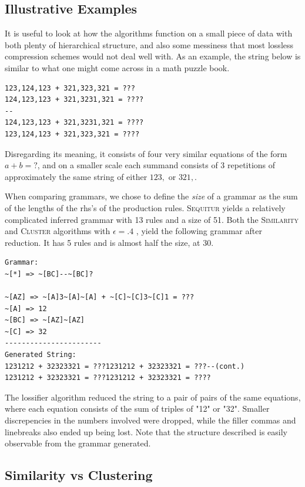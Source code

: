 \documentclass[11pt]{article}
\newcommand{\Sequitur}{\textsc{Sequitur}\xspace}
\newcommand{\Similarity}{\textsc{Similarity}\xspace}
\newcommand{\Cluster}{\textsc{Cluster}\xspace}
\begin{document}
\subsection{Illustrative Examples}

It is useful to look at how the algorithms function on a small piece of data
with both plenty of hierarchical structure, and also some messiness that most
lossless compression schemes would not deal well with. As an example,
the string below is
similar to what one might come across in a math puzzle book.

\begin{verbatim}
123,124,123 + 321,323,321 = ???
124,123,123 + 321,3231,321 = ????
--
124,123,123 + 321,3231,321 = ????
123,124,123 + 321,323,321 = ????
\end{verbatim}

Disregarding its meaning, it consists of four very similar equations of the
form $a + b = ?$, and on a smaller scale each summand consists of 3 repetitions
of approximately the same string of either $123,$ or $321,$.

When comparing grammars, we chose to define the \emph{size} of a grammar as the
sum of the lengths of the rhs's of the production rules.  \Sequitur yields a
relatively complicated inferred grammar with 13 rules and a size of 51. Both
the \Similarity and \Cluster algorithms with $\epsilon = .4$ , yield the
following grammar after reduction. It has 5 rules and is almost half the size,
at 30.

\begin{verbatim}
Grammar:
~[*] => ~[BC]--~[BC]?

~[AZ] => ~[A]3~[A]~[A] + ~[C]~[C]3~[C]1 = ???
~[A] => 12
~[BC] => ~[AZ]~[AZ]
~[C] => 32
-----------------------
Generated String:
1231212 + 32323321 = ???1231212 + 32323321 = ???--(cont.)
1231212 + 32323321 = ???1231212 + 32323321 = ????
\end{verbatim}

The lossifier algorithm reduced the string to a pair of pairs of the same
equations, where each equation consists of the sum of triples of "12" or "32".
Smaller discrepencies in the numbers involved were dropped, while the filler
commas and linebreaks also ended up being lost. Note that the structure
described is easily observable from the grammar generated.

\subsection{Similarity vs Clustering}
\end{document}
